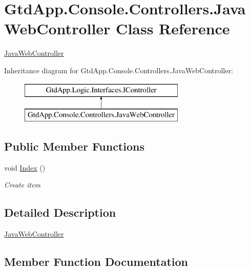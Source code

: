 \hypertarget{class_gtd_app_1_1_console_1_1_controllers_1_1_java_web_controller}{}\section{Gtd\+App.\+Console.\+Controllers.\+Java\+Web\+Controller Class Reference}
\label{class_gtd_app_1_1_console_1_1_controllers_1_1_java_web_controller}


\mbox{\hyperlink{class_gtd_app_1_1_console_1_1_controllers_1_1_java_web_controller}{Java\+Web\+Controller}}  


Inheritance diagram for Gtd\+App.\+Console.\+Controllers.\+Java\+Web\+Controller\+:\begin{figure}[H]
\begin{center}
\leavevmode
\includegraphics[height=2.000000cm]{class_gtd_app_1_1_console_1_1_controllers_1_1_java_web_controller}
\end{center}
\end{figure}
\subsection*{Public Member Functions}
\begin{DoxyCompactItemize}
\item 
void \mbox{\hyperlink{class_gtd_app_1_1_console_1_1_controllers_1_1_java_web_controller_ac3bd0fd5aa54c8258abdf6d2e326375e}{Index}} ()
\begin{DoxyCompactList}\small\item\em Create item \end{DoxyCompactList}\end{DoxyCompactItemize}


\subsection{Detailed Description}
\mbox{\hyperlink{class_gtd_app_1_1_console_1_1_controllers_1_1_java_web_controller}{Java\+Web\+Controller}} 



\subsection{Member Function Documentation}
\mbox{\label{class_gtd_app_1_1_console_1_1_controllers_1_1_java_web_controller_ac3bd0fd5aa54c8258abdf6d2e326375e}} 
